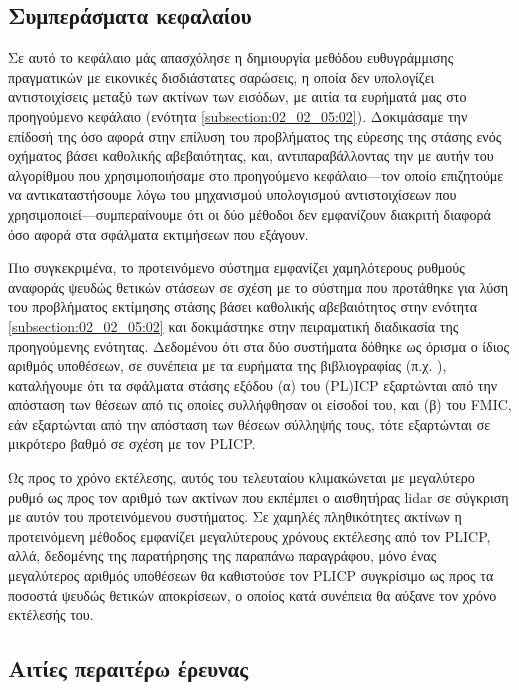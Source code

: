 \subsection{Συμπεράσματα κεφαλαίου}
\label{subsection:02_03_05:01}

Σε αυτό το κεφάλαιο μάς απασχόλησε η δημιουργία μεθόδου ευθυγράμμισης
πραγματικών με εικονικές δισδιάστατες σαρώσεις, η οποία δεν υπολογίζει
αντιστοιχίσεις μεταξύ των ακτίνων των εισόδων, με αιτία τα ευρήματά μας στο
προηγούμενο κεφάλαιο (ενότητα \ref{subsection:02_02_05:02}). Δοκιμάσαμε την
επίδοσή της όσο αφορά στην επίλυση του προβλήματος της εύρεσης της στάσης ενός
οχήματος βάσει καθολικής αβεβαιότητας, και, αντιπαραβάλλοντας την με αυτήν του
αλγορίθμου που χρησιμοποιήσαμε στο προηγούμενο κεφάλαιο---τον οποίο επιζητούμε
να αντικαταστήσουμε λόγω του μηχανισμού υπολογισμού αντιστοιχίσεων που
χρησιμοποιεί---συμπεραίνουμε ότι οι δύο μέθοδοι δεν εμφανίζουν διακριτή διαφορά
όσο αφορά στα σφάλματα εκτιμήσεων που εξάγουν.

Πιο συγκεκριμένα, το προτεινόμενο σύστημα εμφανίζει χαμηλότερους ρυθμούς
αναφοράς ψευδώς θετικών στάσεων σε σχέση με το σύστημα που προτάθηκε για λύση
του προβλήματος εκτίμησης στάσης βάσει καθολικής αβεβαιότητος στην ενότητα
\ref{subsection:02_02_05:02} και δοκιμάστηκε στην πειραματική διαδικασία της
προηγούμενης ενότητας. Δεδομένου ότι στα δύο συστήματα δόθηκε ως όρισμα ο ίδιος
αριθμός υποθέσεων, σε συνέπεια με τα ευρήματα της βιβλιογραφίας (π.χ.
\cite{Olson2009a,bernreiter2021phaser}), καταλήγουμε ότι τα σφάλματα στάσης
εξόδου (α) του (PL)ICP εξαρτώνται από την απόσταση των θέσεων από τις οποίες
συλλήφθησαν οι είσοδοί του, και (β) του FMIC, εάν εξαρτώνται από την απόσταση
των θέσεων σύλληψής τους, τότε εξαρτώνται σε μικρότερο βαθμό σε σχέση με τον
PLICP.

Ως προς το χρόνο εκτέλεσης, αυτός του τελευταίου κλιμακώνεται με μεγαλύτερο
ρυθμό ως προς τον αριθμό των ακτίνων που εκπέμπει ο αισθητήρας lidar σε
σύγκριση με αυτόν του προτεινόμενου συστήματος. Σε χαμηλές πληθικότητες ακτίνων
η προτεινόμενη μέθοδος εμφανίζει μεγαλύτερους χρόνους εκτέλεσης από τον PLICP,
αλλά, δεδομένης της παρατήρησης της παραπάνω παραγράφου, μόνο ένας μεγαλύτερος
αριθμός υποθέσεων θα καθιστούσε τον PLICP συγκρίσιμο ως προς τα ποσοστά ψευδώς
θετικών αποκρίσεων, ο οποίος κατά συνέπεια θα αύξανε τον χρόνο εκτέλεσής του.

\subsection{Αιτίες περαιτέρω έρευνας}
\label{subsection:02_03_05:02}
